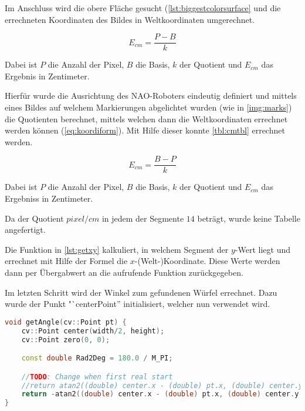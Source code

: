         Im Anschluss wird die obere Fläche gesucht
        (\autoref{lst:biggestcolorsurface} und die errechneten Koordinaten des
        Bildes in Weltkoordinaten umgerechnet.

        \begin{equation} \label{eq:koordiform}
            E_{cm} = \frac{P - B}{k}
        \end{equation}

        Dabei ist $P$ die Anzahl der Pixel, $B$ die Basis, $k$ der Quotient und
        $E_{cm}$ das Ergebnis in Zentimeter.

        Hierfür wurde die Ausrichtung des NAO-Roboters eindeutig definiert und
        mittels eines Bildes auf welchem Markierungen abgelichtet wurden
        (wie in \autoref{img:marks})
        die Quotienten berechnet, mittels welchen dann die Weltkoordinaten
        errechnet werden können (\ref{eq:koordiform}).
        Mit Hilfe dieser konnte \autoref{tbl:cmtbl} errechnet werden.

        \begin{equation} \label{eq:ykoord}
            E_{cm} = \frac{B - P}{k}
        \end{equation}

        Dabei ist $P$ die Anzahl der Pixel, $B$ die Basis, $k$ der Quotient und
        $E_{cm}$ das Ergebniss in Zentimeter.

        Da der Quotient $pixel / cm$ in jedem der Segmente $14$ beträgt, wurde
        keine Tabelle angefertigt.

        Die Funktion in \autoref{lst:getxy} kalkuliert, in welchem Segment der
        $y$-Wert liegt und errechnet mit Hilfe der Formel die
        $x$-(Welt-)Koordinate.
        Diese Werte werden dann per Übergabwert an die aufrufende Funktion
        zurückgegeben.

        Im letzten Schritt wird der Winkel zum gefundenen Würfel errechnet.
        Dazu wurde der Punkt "`centerPoint'' initialisiert, welcher nun
        verwendet wird.

\begin{lstlisting}[language=c++,
                   caption={Funktion: "`getAngle''},
                   label={lst:getAngle}]
void getAngle(cv::Point pt) {
    cv::Point center(width/2, height);
    cv::Point zero(0, 0);

    const double Rad2Deg = 180.0 / M_PI;

    //TODO: Change when first real start
    //return atan2((double) center.x - (double) pt.x, (double) center.y - (double) pt.y) * Rad2Deg; //degree
    return -atan2((double) center.x - (double) pt.x, (double) center.y - (double)pt.y); //rad
}
\end{lstlisting}

